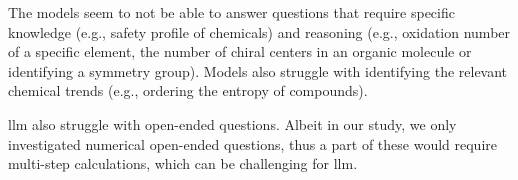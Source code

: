 The models seem to not be able to answer questions that require specific knowledge (e.g., safety profile of chemicals) and reasoning (e.g., oxidation number of a specific element, the number of chiral centers in an organic molecule or identifying a symmetry group).
Models also struggle with identifying the relevant chemical trends (e.g., ordering the entropy of compounds).

\gls{llm} also struggle with open-ended questions. Albeit in our study, we only investigated numerical open-ended questions, thus a part of these would require multi-step calculations, which can be challenging for \gls{llm}.